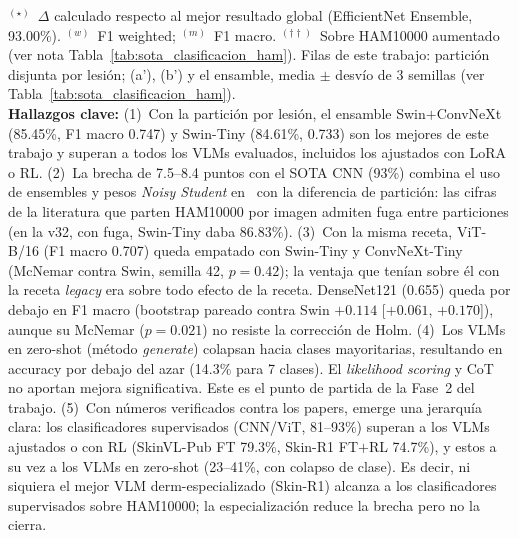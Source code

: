 \begin{table}[htbp]
{\begin{tabular}{@{}llrrrl@{}}
\bottomrule
\end{tabular}%
}
\vspace{4pt}
\begin{minipage}{\textwidth}
  \footnotesize
  $^{(\star)}$~$\Delta$ calculado respecto al mejor resultado global
  (EfficientNet Ensemble, 93.00\%).
  $^{(w)}$~F1 weighted; $^{(m)}$~F1 macro.
  $^{(\dagger\dagger)}$~Sobre HAM10000 aumentado (ver nota Tabla~\ref{tab:sota_clasificacion_ham}).
  Filas de este trabajo: partición disjunta por lesión; (a'), (b') y el ensamble, media $\pm$ desvío de
  3 semillas (ver Tabla~\ref{tab:sota_clasificacion_ham}).\\[4pt]
  \textbf{Hallazgos clave:}
  (1)~Con la partición por lesión, el ensamble Swin$+$ConvNeXt (85.45\%, F1 macro 0.747) y Swin-Tiny
  (84.61\%, 0.733) son los mejores de este trabajo y superan a todos los VLMs evaluados, incluidos los
  ajustados con LoRA o RL.
  (2)~La brecha de 7.5--8.4 puntos con el SOTA CNN (93\%) combina el uso de ensembles y pesos
  \textit{Noisy Student} en~\cite{SkinHealthMate2024} con la diferencia de partición: las cifras de la
  literatura que parten HAM10000 por imagen admiten fuga entre particiones (en la v32, con fuga, Swin-Tiny
  daba 86.83\%).
  (3)~Con la misma receta, ViT-B/16 (F1 macro 0.707) queda empatado con Swin-Tiny y ConvNeXt-Tiny
  (McNemar contra Swin, semilla 42, $p=0.42$); la ventaja que tenían sobre él con la receta \textit{legacy} era sobre
  todo efecto de la receta. DenseNet121 (0.655) queda por debajo en F1 macro (bootstrap pareado contra Swin
  $+0.114$ [$+0.061$, $+0.170$]), aunque su McNemar ($p=0.021$) no resiste la corrección de Holm.
  (4)~Los VLMs en zero-shot (método \textit{generate}) colapsan hacia clases
  mayoritarias, resultando en accuracy por debajo del azar (14.3\% para 7 clases).
  El \textit{likelihood scoring} y CoT no aportan mejora significativa.
  Este es el punto de partida de la Fase~2 del trabajo.
  (5)~Con números verificados contra los papers, emerge una jerarquía clara: los
  clasificadores supervisados (CNN/ViT, 81--93\%) superan a los VLMs ajustados o con RL
  (SkinVL-Pub FT 79.3\%, Skin-R1 FT$+$RL 74.7\%), y estos a su vez a los VLMs en zero-shot
  (23--41\%, con colapso de clase). Es decir, ni siquiera el mejor VLM derm-especializado
  (Skin-R1) alcanza a los clasificadores supervisados sobre HAM10000; la especialización
  reduce la brecha pero no la cierra.
\end{minipage}
\end{table}
